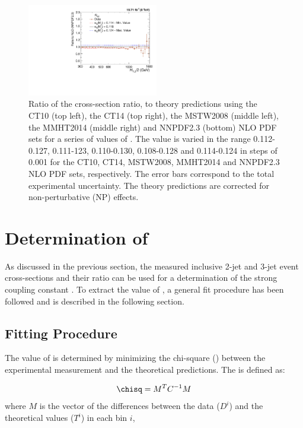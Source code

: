 \begin{figure}[!htbp]
\begin{center}
 \vspace*{3mm}
 \includegraphics[width=0.51\textwidth]{Plots_HT_2_150/Sensitivity_double_ratio_32_NNPDF23.pdf}
 \caption{Ratio of the cross-section ratio, \ratio to theory predictions using the CT10 (top left), the CT14 (top right), the MSTW2008 (middle left), the MMHT2014 (middle right) and NNPDF2.3 (bottom) NLO PDF sets for a series of values of \alpsmz. The \alpsmz value is varied in the range 0.112-0.127, 0.111-123, 0.110-0.130, 0.108-0.128 and 0.114-0.124 in steps of 0.001 for the CT10, CT14, MSTW2008, MMHT2014 and NNPDF2.3 NLO PDF sets, respectively. The error bars correspond to the total experimental uncertainty. The theory predictions are corrected for non-perturbative (NP) effects.}
 \label{fig:sensitivity_double_ratio}
 \end{center}
\end{figure}

\section{Determination of \texorpdfstring{\alpsmz}{alpha-S(M(Z))}}

As discussed in the previous section, the measured inclusive 2-jet and 3-jet event cross-sections and their ratio \ratio can be used for a determination of the strong coupling constant \alpsmz. To extract the value of \alpsmz, a general fit procedure \cite{Chatrchyan:2013txa,Khachatryan:2014waa} has been followed and is described in the following section. 

\subsection{Fitting Procedure}
\label{sec:Fits_procedure}
The value of \alpsmz is determined by minimizing the chi-square (\chisq) between the experimental measurement and the theoretical predictions. The \chisq is defined as:

\begin{equation}
  \label{chisq}
  \chisq = M^{T}C^{-1}M
\end{equation}
where $M$ is the vector of the differences between the data ($D^{i}$) and the theoretical values ($T^{i}$) in each bin $i$,

